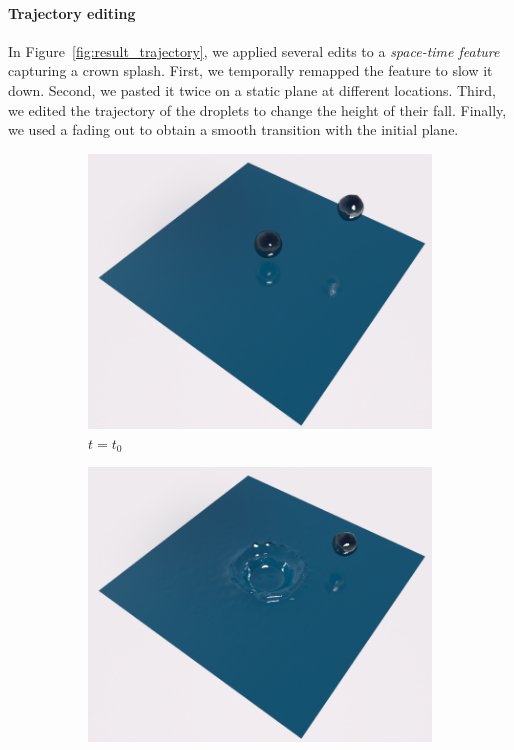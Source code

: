\paragraph{Trajectory editing}

In Figure~\ref{fig:result_trajectory}, we applied several edits to a \emph{space-time feature} capturing a crown splash. First, we temporally remapped the feature to slow it down. 
Second, we pasted it twice on a static plane at different locations. 
Third, we edited the trajectory of the droplets to change the height of their fall. 
Finally, we used a fading out to obtain a smooth transition with the initial plane.

\begin{figure}[!h]
	\centering
	\begin{subfigure}[b]{0.3\linewidth}
		\centering
		\includegraphics[width=\textwidth]{images/fluidsculpting-mig2016/results/two_drops_0.png}
		\caption{\label{fig:result_trajectory:t0}$t=t_{0}$}
	\end{subfigure}
	\hspace{0.1cm}
	\begin{subfigure}[b]{0.3\linewidth}
		\centering
		\includegraphics[width=\textwidth]{images/fluidsculpting-mig2016/results/two_drops_1.png}

\end{subfigure}
\end{figure}
